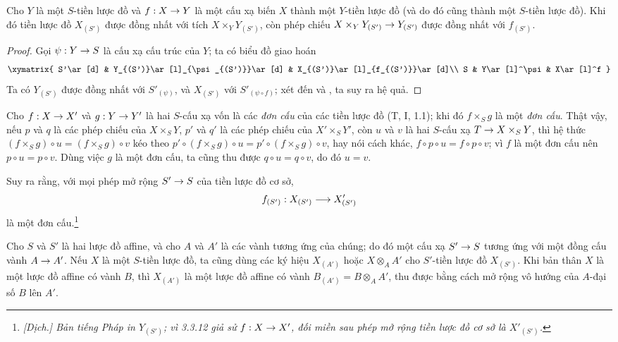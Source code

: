 \documentclass[oneside]{amsart}
\makeatletter
\newcommand{\ega@arrow}[2]{\mathchoice{#1}{#2}{#2}{#2}}
\renewcommand{\to}{\ega@arrow{\longrightarrow}{\rightarrow}}
\newcommand{\oldpage}[2][]{{\marginnote{\normalfont\textbf{#1}~|~#2}}\ignorespaces}
\let\EGAOriginalLabel\label
\renewcommand{\label}[1]{\phantomsection\EGAOriginalLabel{#1}}
\makeatother
\begin{document}
\begin{corollary}[3.3.11]
\label{I.3.3.11}
Cho $Y$ là một $S$-tiền lược đồ và $f:X\to Y$ là một cấu xạ biến $X$ thành
một $Y$-tiền lược đồ (và do đó cũng thành một $S$-tiền lược đồ). Khi đó tiền
lược đồ $X_{(S')}$ được đồng nhất với tích $X\times_Y Y_{(S')}$, còn phép
chiếu $X\times_Y Y_{(S')}\to Y_{(S')}$ được đồng nhất với $f_{(S')}$. 
\end{corollary}

\begin{proof}
Gọi $\psi:Y\to S$ là cấu xạ cấu trúc của $Y$; ta có biểu đồ giao hoán
\[
  \xymatrix{
    S'\ar[d] &
    Y_{(S')}\ar[l]_{\psi_{(S')}}\ar[d] &
    X_{(S')}\ar[l]_{f_{(S')}}\ar[d]\\
    S &
    Y\ar[l]^\psi &
    X\ar[l]^f
  }
\]
Ta có $Y_{(S')}$ được đồng nhất với $S'_{(\psi)}$, và $X_{(S')}$ với
$S'_{(\psi\circ f)}$; xét đến  và , ta suy ra
hệ quả.
\end{proof}

\begin{env}[3.3.12]
\label{I.3.3.12}
Cho $f:X\to X'$ và $g:Y\to Y'$ là hai $S$-cấu xạ vốn là các
\emph{đơn cấu} của các tiền lược đồ (T, I, 1.1); khi đó $f\times_S g$ là một
\emph{đơn cấu}. Thật vậy, nếu $p$ và $q$ là các phép chiếu của
$X\times_S Y$, $p'$ và $q'$ là các phép chiếu của $X'\times_S Y'$, còn $u$
và $v$ là hai $S$-cấu xạ $T\to X\times_S Y$, thì hệ thức
$(f\times_S g)\circ u=(f\times_S g)\circ v$ kéo theo
$p'\circ(f\times_S g)\circ u=p'\circ(f\times_S g)\circ v$, hay nói cách khác,
$f\circ p\circ u=f\circ p\circ v$; vì $f$ là một đơn cấu nên
$p\circ u=p\circ v$. Dùng việc $g$ là một đơn cấu, ta cũng thu được
$q\circ u=q\circ v$, do đó $u=v$.

\oldpage[I]{111}
Suy ra rằng, với mọi phép mở rộng $S'\to S$ của tiền lược đồ cơ sở,
\[
  f_{(S')}:X_{(S')}\to X'_{(S')}
\]
là một đơn cấu.\footnote{\emph{[Dịch.] Bản tiếng Pháp in $Y_{(S')}$; vì
3.3.12 giả sử $f:X\to X'$, đối miền sau phép mở rộng tiền lược đồ cơ sở là
$X'_{(S')}$.}}
\end{env}

\begin{env}[3.3.13]
\label{I.3.3.13}
Cho $S$ và $S'$ là hai lược đồ affine, và cho $A$ và $A'$ là các vành tương
ứng của chúng; do đó một cấu xạ $S'\to S$ tương ứng với một đồng cấu vành
$A\to A'$. Nếu $X$ là một $S$-tiền lược đồ, ta cũng dùng các ký hiệu
$X_{(A')}$ hoặc $X\otimes_A A'$ cho $S'$-tiền lược đồ $X_{(S')}$. Khi bản thân
$X$ là một lược
đồ affine có vành $B$, thì $X_{(A')}$ là một lược đồ affine có vành
$B_{(A')}=B\otimes_A A'$, thu được bằng cách mở rộng vô hướng của $A$-đại số
$B$ lên $A'$.
\end{env}
\end{document}

